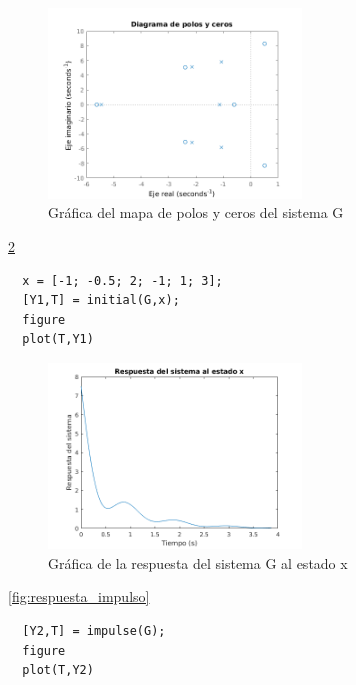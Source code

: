 \documentclass[12pt,letterpaper]{article}
\begin{document}
\begin{figure}[ht!]
	\centering
	\includegraphics[width=0.6\textwidth]{pictures/Ejercicio5/diag_polos_ceros}
	\caption{Gráfica del mapa de polos y ceros del sistema G}
	\label{fig:diag_polos_ceros}
\end{figure} 






\ref{fig:respuesta_estado_x}

\begin{lstlisting}[style=Matlab-editor, basicstyle=\mlttfamily]
  % Respuesta natural al estado x
  x = [-1; -0.5; 2; -1; 1; 3];
  [Y1,T] = initial(G,x);
  figure
  plot(T,Y1)
\end{lstlisting}

\begin{figure}[ht!]
	\centering
	\includegraphics[width=0.6\textwidth]{pictures/Ejercicio5/respuesta_estado_x}
	\caption{Gráfica de la respuesta del sistema G al estado x}
	\label{fig:respuesta_estado_x}
\end{figure} 






\ref{fig:respuesta_impulso}

\begin{lstlisting}[style=Matlab-editor, basicstyle=\mlttfamily]
  % Respuesta al impulso 
  [Y2,T] = impulse(G);
  figure
  plot(T,Y2)
\end{lstlisting}
\end{document}
